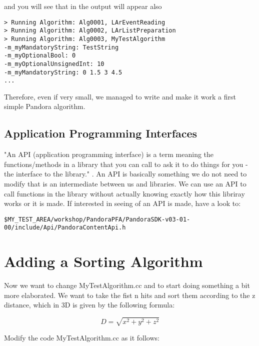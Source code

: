 and you will see that in the output will appear also

\begin{lstlisting}[caption=Python example]
> Running Algorithm: Alg0001, LArEventReading
> Running Algorithm: Alg0002, LArListPreparation
> Running Algorithm: Alg0003, MyTestAlgorithm
-m_myMandatoryString: TestString
-m_myOptionalBool: 0
-m_myOptionalUnsignedInt: 10
-m_myMandatoryString: 0 1.5 3 4.5 
...
\end{lstlisting}

Therefore, even if very small, we managed to write and make it work a first simple Pandora algorithm.

\subsection{Application Programming Interfaces} \label{sssec:api}

"An API (application programming interface) is a term meaning the functions/methods in a library that you can call to ask it to do things for you - the interface to the library." \cite{stack_basics}. An API is basically something we do not need to modify that is an intermediate between us and libraries. We can use an API to call functions in the library without actually knowing exactly how this libriray works or it is made. If interested in seeing of an API is made, have a look to:

\begin{verbatim}
$MY_TEST_AREA/workshop/PandoraPFA/PandoraSDK-v03-01-00/include/Api/PandoraContentApi.h 
\end{verbatim}

\section{Adding a Sorting Algorithm} \label{sssec:sorting}

Now we want to change MyTestAlgorithm.cc and to start doing something a bit more elaborated. We want to take the fist n hits and sort them according to the z distance, which in 3D is given by the following formula:

\begin{equation}\label{eq:distance}
D=\sqrt{x^2+y^2+z^2}
\end{equation}

Modify the code MyTestAlgorithm.cc as it follows:

